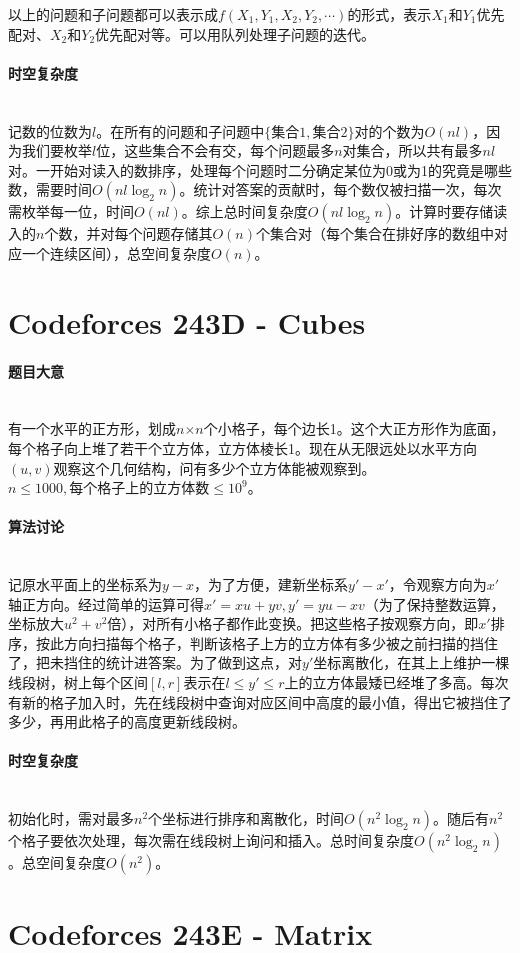 \documentclass[UTF8]{ctexart}
\newcommand{\myparagraph}[1]{\paragraph{#1}\mbox{}\\}
\theoremstyle{nonumberplain}
\begin{document}
			以上的问题和子问题都可以表示成$f({X_1,Y_1},{X_2,Y_2},\cdots)$的形式，表示$X_1$和$Y_1$优先配对、$X_2$和$Y_2$优先配对等。可以用队列处理子问题的迭代。
		
		\myparagraph{时空复杂度}
		
			记数的位数为$l$。在所有的问题和子问题中$\{\mbox{集合}1,\mbox{集合}2\}$对的个数为$O(nl)$，因为我们要枚举$l$位，这些集合不会有交，每个问题最多$n$对集合，所以共有最多$nl$对。一开始对读入的数排序，处理每个问题时二分确定某位为0或为1的究竟是哪些数，需要时间$O(nl\log_2n)$。统计对答案的贡献时，每个数仅被扫描一次，每次需枚举每一位，时间$O(nl)$。综上总时间复杂度$O(nl\log_2n)$。计算时要存储读入的$n$个数，并对每个问题存储其$O(n)$个集合对（每个集合在排好序的数组中对应一个连续区间），总空间复杂度$O(n)$。
	
	\section{Codeforces 243D - Cubes}
	
		\myparagraph{题目大意}
		
			有一个水平的正方形，划成$n$×$n$个小格子，每个边长1。这个大正方形作为底面，每个格子向上堆了若干个立方体，立方体棱长1。现在从无限远处以水平方向$(u,v)$观察这个几何结构，问有多少个立方体能被观察到。$n \leq 1000, \mbox{每个格子上的立方体数} \leq 10^9$。
		
		\myparagraph{算法讨论}
		
			记原水平面上的坐标系为$y-x$，为了方便，建新坐标系$y'-x'$，令观察方向为$x'$轴正方向。经过简单的运算可得$x'=xu+yv, y'=yu-xv$（为了保持整数运算，坐标放大$u^2+v^2$倍），对所有小格子都作此变换。把这些格子按观察方向，即$x'$排序，按此方向扫描每个格子，判断该格子上方的立方体有多少被之前扫描的挡住了，把未挡住的统计进答案。为了做到这点，对$y'$坐标离散化，在其上上维护一棵线段树，树上每个区间$[l,r]$表示在$l \leq y' \leq r$上的立方体最矮已经堆了多高。每次有新的格子加入时，先在线段树中查询对应区间中高度的最小值，得出它被挡住了多少，再用此格子的高度更新线段树。
		
		\myparagraph{时空复杂度}
		
			初始化时，需对最多$n^2$个坐标进行排序和离散化，时间$O(n^2\log_2n)$。随后有$n^2$个格子要依次处理，每次需在线段树上询问和插入。总时间复杂度$O(n^2\log_2n)$。总空间复杂度$O(n^2)$。
	
	\section{Codeforces 243E - Matrix}
	
\end{document}
